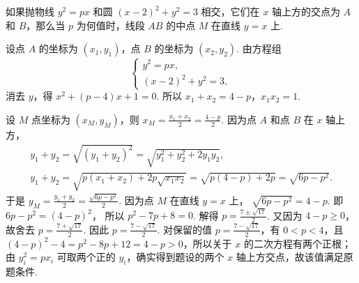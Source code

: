 \begin{problem}

如果抛物线 \(y^{2}=px\) 和圆 \((x-2)^{2}+y^{2}=3\) 相交，它们在 \(x\) 轴上方的交点为 \(A\) 和 \(B\)，那么当 \(p\) 为何值时，线段 \(AB\) 的中点 \(M\) 在直线 \(y=x\) 上.

\end{problem}

\begin{solution}
%
设点 \(A\) 的坐标为 \((x_{1},y_{1})\)，点 \(B\) 的坐标为 \((x_{2},y_{2})\). 由方程组
\[
\begin{cases}
y^{2}=px,\\
(x-2)^{2}+y^{2}=3,
\end{cases}
\]
消去 \(y\)，得 \(x^{2}+(p-4)x+1=0\).
所以 \(x_{1}+x_{2}=4-p\)，\(x_{1}x_{2}=1\).

设 \(M\) 点坐标为 \((x_{M},y_{M})\)，则 \(x_{M}=\frac{x_{1}+x_{2}}{2}=\frac{4-p}{2}\).
因为点 \(A\) 和点 \(B\) 在 \(x\) 轴上方，
\[
\begin{gathered}
y_{1}+y_{2}=\sqrt{\left( y_{1}+y_{2} \right)^{2}}=\sqrt{y_{1}^{2}+y_{2}^{2}+2y_{1}y_{2}},\\
y_{1}+y_{2}=\sqrt{p\left( x_{1}+x_{2} \right)+2p\sqrt{x_{1}x_{2}}}=\sqrt{p(4-p)+2p}=\sqrt{6p-p^{2}}.
\end{gathered}
\]
于是 \(y_{M}=\frac{y_{1}+y_{2}}{2}=\frac{\sqrt{6p-p^{2}}}{2}\).
因为点 \(M\) 在直线 \(y=x\) 上，
\(\sqrt{6p-p^{2}}=4-p\).
即 \(6p-p^{2}=\left( 4-p \right)^{2}\)，
所以 \(p^{2}-7p+8=0\).
解得 \(p=\frac{7\pm \sqrt{17}}{2}\).
又因为 \(4-p\geqslant 0\)，故舍去 \(p=\frac{7+\sqrt{17}}{2}\). 因此 \(p=\frac{7-\sqrt{17}}{2}\).
对保留的值 \(p=\frac{7-\sqrt{17}}{2}\)，有 \(0<p<4\)，且 \((4-p)^2-4=p^2-8p+12=4-p>0\)，所以关于 \(x\) 的二次方程有两个正根；由 \(y_i^2=px_i\) 可取两个正的 \(y_i\)，确实得到题设的两个 \(x\) 轴上方交点，故该值满足原题条件.
\end{solution}
